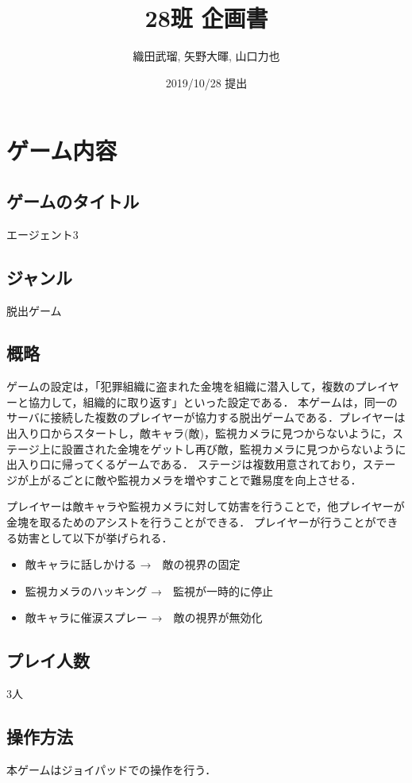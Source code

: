 \documentclass{jarticle}
\title{28班 企画書}
\author{織田武瑠, 矢野大暉, 山口力也}
\date{2019/10/28 提出}
\begin{document}
\maketitle

\section{ゲーム内容}
\subsection{ゲームのタイトル}
エージェント3

\subsection{ジャンル}
脱出ゲーム

\subsection{概略}
ゲームの設定は，「犯罪組織に盗まれた金塊を組織に潜入して，複数のプレイヤーと協力して，組織的に取り返す」といった設定である．
本ゲームは，同一のサーバに接続した複数のプレイヤーが協力する脱出ゲームである．プレイヤーは出入り口からスタートし，敵キャラ(敵)，監視カメラに見つからないように，ステージ上に設置された金塊をゲットし再び敵，監視カメラに見つからないように出入り口に帰ってくるゲームである．
ステージは複数用意されており，ステージが上がるごとに敵や監視カメラを増やすことで難易度を向上させる．

プレイヤーは敵キャラや監視カメラに対して妨害を行うことで，他プレイヤーが金塊を取るためのアシストを行うことができる．
プレイヤーが行うことができる妨害として以下が挙げられる．
\begin{itemize}
\item 敵キャラに話しかける →　敵の視界の固定
\item 監視カメラのハッキング →　監視が一時的に停止
\item 敵キャラに催涙スプレー →　敵の視界が無効化
\end{itemize}

\subsection{プレイ人数}
3人

\subsection{操作方法}
本ゲームはジョイパッドでの操作を行う．
\end{document}
